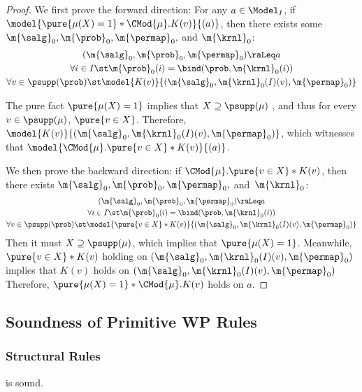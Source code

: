 \documentclass[acmsmall,nonacm,screen,appendix]{acmart}
\begin{document}
\begin{proof}
  We first prove the forward direction:
  For any $a \in \Model_I$,
  if $\model{\pure{\mu(X) = 1} \ast \CMod{\mu}. K(v)}{(a)}$,
  then there exists some
  $\m{\salg}_0, \m{\prob}_0,\m{\permap}_0,$ and $ \m{\krnl}_0 $:
  \begin{gather*}
    (\m{\salg}_0, \m{\prob}_0,\m{\permap}_0) \raLeq a
    \\
    \forall i\in I\st
      \m{\prob}_0(i) = \bind(\prob, \m{\krnl}_0(i)) \\
      \forall v \in \psupp(\prob) \st
      \model{K(v)}{(\m{\salg}_0, \m{\krnl}_0(I)(v), \m{\permap}_0)}
  \end{gather*}

   The pure fact $\pure{\mu(X) = 1}$ implies that
   $X \supseteq \psupp(\mu)$ , and thus
   for every $v \in \psupp(\mu)$, $\pure{v \in X}$.
   Therefore, $\model{K(v)}{(\m{\salg}_0, \m{\krnl}_0(I)(v), \m{\permap}_0)}$,
   which witnesses that
   $\model{\CMod{\mu}. \pure{v \in X} \ast K(v)}{(a)}$.

  We then prove the backward direction:
  if $\CMod{\mu}. \pure{v \in X} \ast K(v) $,
  then there exists
    $\m{\salg}_0, \m{\prob}_0,\m{\permap}_0,$ and~$ \m{\krnl}_0 $:
  \begin{gather*}
    (\m{\salg}_0, \m{\prob}_0,\m{\permap}_0) \raLeq a
    \\
    \forall i\in I\st
      \m{\prob}_0(i) = \bind(\prob, \m{\krnl}_0(i)) \\
      \forall v \in \psupp(\prob) \st
      \model{\pure{v \in X} \ast K(v)}{(\m{\salg}_0, \m{\krnl}_0(I)(v), \m{\permap}_0)}
  \end{gather*}
  Then it must $X \supseteq \psupp(\mu)$,
  which implies that $\pure{\mu(X) = 1}$.
  Meanwhile, $\pure{v \in X} \ast K(v)$ holding on ${(\m{\salg}_0, \m{\krnl}_0(I)(v), \m{\permap}_0)}$
  implies that $K(v)$ holds on
  ${(\m{\salg}_0, \m{\krnl}_0(I)(v), \m{\permap}_0)}$
  Therefore, $\pure{\mu(X) = 1} \ast \CMod{\mu}. K(v)$ holds on $a$.
\end{proof}
 

\subsection{Soundness of Primitive WP Rules}
\label{sec:appendix:wp-rules}


\subsubsection{Structural Rules}
\begin{lemma}
\label{proof:wp-cons}
   is sound.
\end{lemma}
\end{document}
